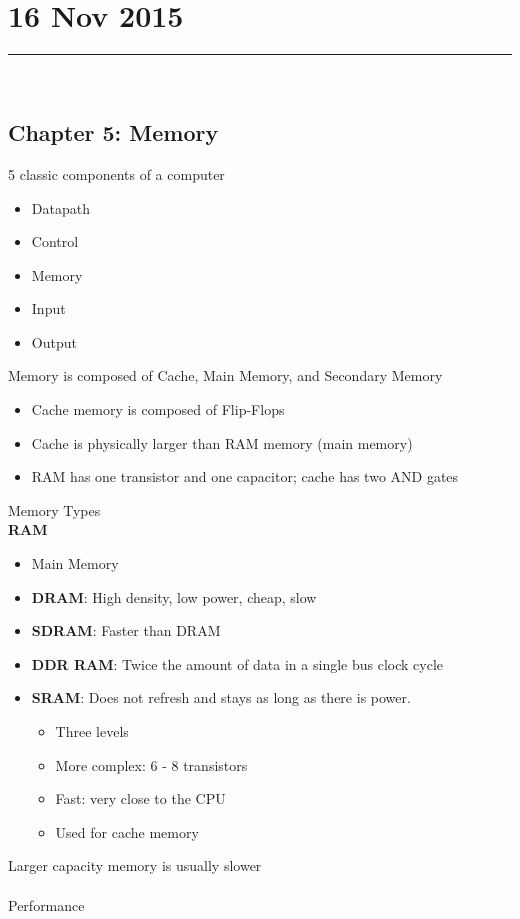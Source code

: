 \documentclass{article}
\begin{document}
\section*{16 Nov 2015}
\hrule
\noindent\\
\subsection*{Chapter 5: Memory}
\begin{multicols}{2}
5 classic components of a computer
\begin{itemize}
\item Datapath
\item Control
\item Memory
\item Input
\item Output
\end{itemize}
Memory is composed of Cache, Main Memory, and Secondary Memory\\
\begin{itemize}
\item Cache memory is composed of Flip-Flops
\item Cache is physically larger than RAM memory (main memory)
\item RAM has one transistor and one capacitor; cache has two AND gates
\end{itemize}
Memory Types\\
\textbf{RAM}
\begin{itemize}
\item Main Memory
\item \textbf{DRAM}: High density, low power, cheap, slow
\item \textbf{SDRAM}: Faster than DRAM
\item \textbf{DDR RAM}: Twice the amount of data in a single bus clock cycle
\item \textbf{SRAM}: Does not refresh and stays as long as there is power.
\begin{itemize}
\item Three levels
\item More complex: 6 - 8 transistors
\item Fast: very close to the CPU
\item Used for cache memory
\end{itemize}
\end{itemize}
Larger capacity memory is usually slower\\\\
Performance
\end{multicols}
\end{document}
